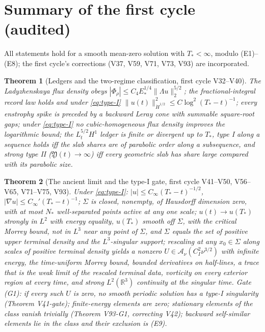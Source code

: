 \documentclass[11pt]{article}
\newcommand{\R}{\mathbb R}
\theoremstyle{plain}
\newtheorem{theorem}{Theorem}[section]
\theoremstyle{definition}
\theoremstyle{remark}
\begin{document}
\section{Summary of the first cycle (audited)}
\label{sec:c4v1-cycle1}

All statements hold for a smooth mean-zero solution with \(T_*<\infty\),
modulo (E1)--(E8); the first cycle's corrections (V37, V59, V71, V73,
V93) are incorporated.

\begin{theorem}[Ledgers and the two-regime classification, first cycle V32--V40]
\label{thm:c4v1-ledgers}
The Ladyzhenskaya flux density obeys \(|\Phi_\rho|\le C_4E_*^{1/4}\|\Lambda u\|_2^{5/2}\);
the fractional-integral record law holds and under \eqref{eq:type-I}
\(\|u(t)\|_{\dot H^{1/2}}^2\le C\log^2(T_*-t)^{-1}\); every enstrophy spike is
preceded by a backward Leray cone with summable square-root gaps;
under \eqref{eq:type-I} no cubic-homogeneous flux density improves the
logarithmic bound; the \(L^{5/2}_tH^1\) ledger is finite or divergent up
to \(T_*\), type I along a sequence holds iff the slab shares are of
parabolic order along a subsequence, and strong type II
(\(\mathfrak Y(t)\to\infty\)) iff every geometric slab has share large
compared with its parabolic size.
\end{theorem}

\begin{theorem}[The ancient limit and the type-I gate, first cycle V41--V50, V56--V65, V71--V75, V93]
\label{thm:c4v1-ancient}
Under \eqref{eq:type-I}: \(|u|\le C_\infty(T_*-t)^{-1/2}\), \(|\nabla u|\le C_\infty'(T_*-t)^{-1}\);
\(\Sigma\) is closed, nonempty, of Hausdorff dimension zero, with at most
\(N_*\) well-separated points active at any one scale; \(u(t)\to u(T_*)\)
strongly in \(L^2\) with energy equality, \(u(T_*)\) smooth off \(\Sigma\),
with the critical Morrey bound, not in \(L^3\) near any point of
\(\Sigma\), and \(\Sigma\) equals the set of positive upper terminal density
and the \(L^3\)-singular support; rescaling at any \(x_0\in\Sigma\) along
scales of positive terminal density yields a nonzero
\(U\in\mathcal A_\nu(C_I^2\nu^{3/2})\) with infinite energy, the time-uniform
Morrey bound, bounded derivatives on half-lines, a trace that is the
weak limit of the rescaled terminal data, vorticity on every exterior
region at every time, and strong \(L^2(\R^3)\) continuity at the
singular time.  \emph{Gate (G1):} if every such \(U\) is zero, no smooth
periodic solution has a type-I singularity (Theorem V41-gate);
finite-energy elements are zero; stationary elements of the class
vanish trivially (Theorem V93-G1, correcting V42); backward
self-similar elements lie in the class and their exclusion is (E9).
\end{theorem}
\end{document}
